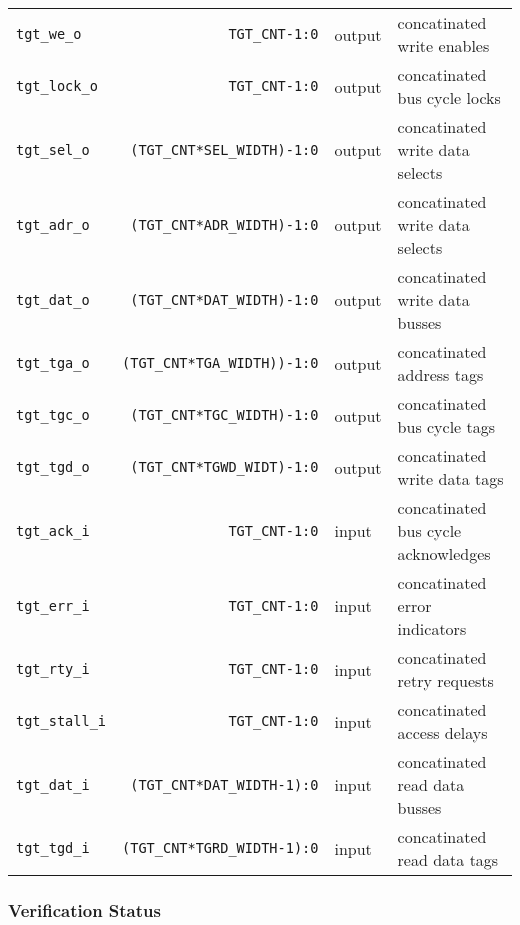 \begin{center}
\begin{longtable}{|l|r|l|l|}
    \texttt{tgt\_we\_o}          & \texttt{TGT\_CNT-1:0}               & output & concatinated write enables	      \\
    \texttt{tgt\_lock\_o}        & \texttt{TGT\_CNT-1:0}               & output & concatinated bus cycle locks	      \\
    \texttt{tgt\_sel\_o}         & \texttt{(TGT\_CNT*SEL\_WIDTH)-1:0}  & output & concatinated write data selects     \\
    \texttt{tgt\_adr\_o}         & \texttt{(TGT\_CNT*ADR\_WIDTH)-1:0}  & output & concatinated write data selects     \\
    \texttt{tgt\_dat\_o}         & \texttt{(TGT\_CNT*DAT\_WIDTH)-1:0}  & output & concatinated write data busses      \\
    \texttt{tgt\_tga\_o}         & \texttt{(TGT\_CNT*TGA\_WIDTH))-1:0} & output & concatinated address tags	      \\
    \texttt{tgt\_tgc\_o}         & \texttt{(TGT\_CNT*TGC\_WIDTH)-1:0}  & output & concatinated bus cycle tags	      \\
    \texttt{tgt\_tgd\_o}         & \texttt{(TGT\_CNT*TGWD\_WIDT)-1:0}  & output & concatinated write data tags	      \\
    \texttt{tgt\_ack\_i}         & \texttt{TGT\_CNT-1:0}               & input  & concatinated bus cycle acknowledges \\
    \texttt{tgt\_err\_i}         & \texttt{TGT\_CNT-1:0}               & input  & concatinated error indicators	      \\
    \texttt{tgt\_rty\_i}         & \texttt{TGT\_CNT-1:0}               & input  & concatinated retry requests	      \\
    \texttt{tgt\_stall\_i}       & \texttt{TGT\_CNT-1:0}               & input  & concatinated access delays	      \\
    \texttt{tgt\_dat\_i}         & \texttt{(TGT\_CNT*DAT\_WIDTH-1):0} & input  & concatinated read data busses	      \\
    \texttt{tgt\_tgd\_i}         & \texttt{(TGT\_CNT*TGRD\_WIDTH-1):0} & input  & concatinated read data tags         \\   
  \end{longtable}
\end{center}  
\endgroup

\subsubsection{Verification Status}
\label{split:verif}

